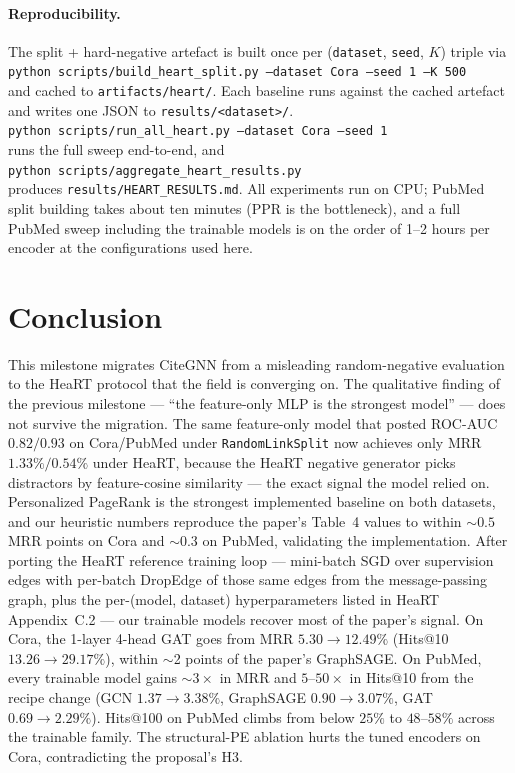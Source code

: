 \documentclass[10pt,a4paper]{article}
\begin{document}
\paragraph{Reproducibility.}
The split + hard-negative artefact is built once per
(\texttt{dataset}, \texttt{seed}, $K$) triple via\\
\texttt{python scripts/build\_heart\_split.py --dataset Cora --seed 1 --K 500}\\
and cached to \texttt{artifacts/heart/}. Each baseline runs against the
cached artefact and writes one JSON to \texttt{results/<dataset>/}.\\
\texttt{python scripts/run\_all\_heart.py --dataset Cora --seed 1}\\
runs the full sweep end-to-end, and\\
\texttt{python scripts/aggregate\_heart\_results.py}\\
produces \texttt{results/HEART\_RESULTS.md}. All experiments run on
CPU; PubMed split building takes about ten minutes (PPR is the
bottleneck), and a full PubMed sweep including the trainable models is
on the order of 1--2 hours per encoder at the configurations used here.

\section{Conclusion}
This milestone migrates CiteGNN from a misleading random-negative
evaluation to the HeaRT protocol that the field is converging on. The
qualitative finding of the previous milestone --- ``the feature-only MLP
is the strongest model'' --- does not survive the migration. The same
feature-only model that posted ROC-AUC $0.82 / 0.93$ on Cora/PubMed under
\texttt{RandomLinkSplit} now achieves only MRR $1.33\% / 0.54\%$ under
HeaRT, because the HeaRT negative generator picks distractors by
feature-cosine similarity --- the exact signal the model relied on.
Personalized PageRank is the strongest implemented baseline on both
datasets, and our heuristic numbers reproduce the paper's Table~4 values
to within $\sim 0.5$ MRR points on Cora and $\sim 0.3$ on PubMed,
validating the implementation. After porting the HeaRT reference training loop --- mini-batch SGD over
supervision edges with per-batch DropEdge of those same edges from the
message-passing graph, plus the per-(model, dataset) hyperparameters
listed in HeaRT Appendix~C.2 --- our trainable models recover most of
the paper's signal. On Cora, the 1-layer 4-head GAT goes from MRR
$5.30 \to 12.49\%$ (Hits@10 $13.26 \to 29.17\%$), within $\sim$2
points of the paper's GraphSAGE. On PubMed, every trainable model
gains $\sim 3\times$ in MRR and $5$--$50\times$ in Hits@10 from the
recipe change (GCN $1.37 \to 3.38\%$, GraphSAGE $0.90 \to 3.07\%$,
GAT $0.69 \to 2.29\%$). Hits@100 on PubMed climbs from below $25\%$ to
$48$--$58\%$ across the trainable family. The structural-PE ablation
hurts the tuned encoders on Cora, contradicting the proposal's H3.
\end{document}
